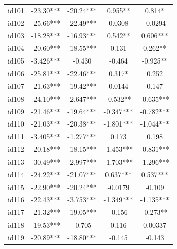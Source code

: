 \documentclass[num-refs]{wiley-article}
\begin{document}
\begin{center}
\begin{longtable}{ccccc}
id101                    & -23.30*** & -20.24***      & 0.955**           & 0.814*            \\
id102                    & -25.66*** & -22.49***      & 0.0308            & -0.0294           \\
id103                    & -18.28*** & -16.93***      & 0.542**           & 0.606***          \\
id104                    & -20.60*** & -18.55***      & 0.131             & 0.262**           \\
id105                    & -3.426*** & -0.430         & -0.464            & -0.925**          \\
id106                    & -25.81*** & -22.46***      & 0.317*            & 0.252             \\
id107                    & -21.63*** & -19.42***      & 0.0144            & 0.147             \\
id108                    & -24.10*** & -2.647***      & -0.532**          & -0.635***         \\
id109                    & -21.46*** & -19.64***      & -0.347***         & -0.782***         \\
id110                    & -21.03*** & -20.38***      & -1.801***         & -1.044***         \\
id111                    & -3.405*** & -1.277***      & 0.173             & 0.198             \\
id112                    & -20.18*** & -18.15***      & -1.453***         & -0.831***         \\
id113                    & -30.49*** & -2.997***      & -1.703***         & -1.296***         \\
id114                    & -24.22*** & -21.07***      & 0.637***          & 0.537***          \\
id115                    & -22.90*** & -20.24***      & -0.0179           & -0.109            \\
id116                    & -22.43*** & -3.753***      & -1.349***         & -1.135***         \\
id117                    & -21.32*** & -19.05***      & -0.156            & -0.273**          \\
id118                    & -19.53*** & -0.705         & 0.116             & 0.00337           \\
id119                    & -20.89*** & -18.80***      & -0.145            & -0.143            \\

\end{longtable}
\end{center}
\end{document}
